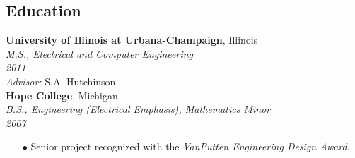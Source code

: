 \documentclass{article}
\begin{document}
{\setlength{\columnsep}{30px}
\begin{multicols}{2}

%
%
\section*{Education}
\noindent
\textbf{University of Illinois at Urbana-Champaign}, Illinois\\
\textsl{M.S., Electrical and Computer Engineering}\\
\textsl{2011}\\
\textsl{Advisor:} S.A. Hutchinson \hfill\\
\linebreak
\noindent
\textbf{Hope College}, Michigan\\
\textsl{B.S., Engineering (Electrical Emphasis), Mathematics Minor} \hfill\\
\textsl{2007}
\vspace{-4px}
    \begin{itemize}
        \item[\tiny$\bullet$]Senior project recognized with the \textit{VanPutten Engineering Design Award}.
    \end{itemize}
    \vspace{ -2 mm}

\end{multicols}}
\end{document}
